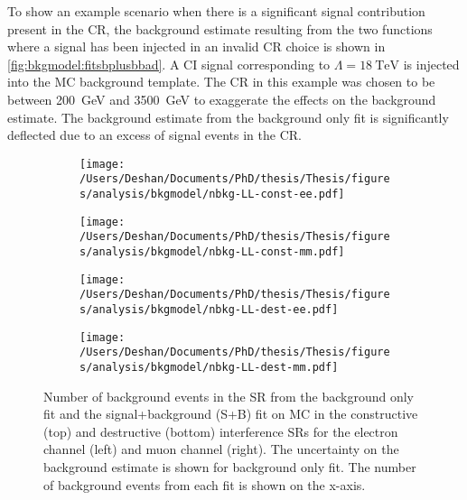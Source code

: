 To show an example scenario when there is a significant signal contribution present in the CR, the background estimate resulting from the two functions where a signal has been injected in an invalid CR choice is shown in \cref{fig:bkgmodel:fitsbplusbbad}. A CI signal corresponding to $\Lambda = \SI{18}{\tera\electronvolt}$ is injected into the MC background template. The CR in this example was chosen to be between \SI{200}{\giga\electronvolt} and \SI{3500}{\giga\electronvolt} to exaggerate the effects on the background estimate. The background estimate from the background only fit is significantly deflected due to an excess of signal events in the CR.

\begin{figure}[h!]
    \centering
    \begin{subfigure}[b]{0.49\textwidth}
        \centering
        \texttt{[image: /Users/Deshan/Documents/PhD/thesis/Thesis/figures/analysis/bkgmodel/nbkg-LL-const-ee.pdf]}
        \label{fig:bkgmodel:fitsbplusb1}
    \end{subfigure}
    \begin{subfigure}[b]{0.49\textwidth}
        \centering
        \texttt{[image: /Users/Deshan/Documents/PhD/thesis/Thesis/figures/analysis/bkgmodel/nbkg-LL-const-mm.pdf]}
        \label{fig:bkgmodel:fitsbplusb2}
    \end{subfigure}
    \begin{subfigure}[b]{0.49\textwidth}
        \centering
        \texttt{[image: /Users/Deshan/Documents/PhD/thesis/Thesis/figures/analysis/bkgmodel/nbkg-LL-dest-ee.pdf]}
        \label{fig:bkgmodel:fitsbplusb3}
    \end{subfigure}
    \begin{subfigure}[b]{0.49\textwidth}
        \centering
        \texttt{[image: /Users/Deshan/Documents/PhD/thesis/Thesis/figures/analysis/bkgmodel/nbkg-LL-dest-mm.pdf]}
        \label{fig:bkgmodel:fitsbplusb4}
    \end{subfigure}
    \caption[Background estimation comparisons of the signal+background fit and background only fit]{Number of background events in the SR from the background only fit and the signal+background (S+B) fit on MC in the constructive (top) and destructive (bottom) interference SRs for the electron channel (left) and muon channel (right). The uncertainty on the background estimate is shown for background only fit. The number of background events from each fit is shown on the x-axis.}
    \label{fig:bkgmodel:fitsbplusb}
\end{figure}

